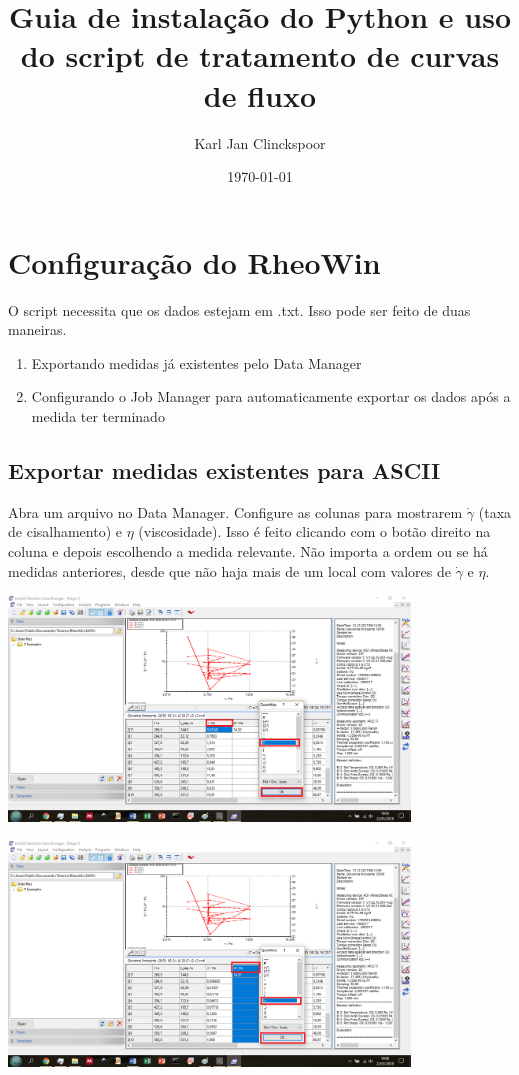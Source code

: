 \documentclass[a4paper, 12pt]{article}
\title{Guia de instalação do Python e uso do script de tratamento de curvas de fluxo}
\author{Karl Jan Clinckspoor}
\date{\today}
\begin{document}
\maketitle

\tableofcontents

\section{Configuração do RheoWin}

O script necessita que os dados estejam em .txt. Isso pode ser feito de duas maneiras.

\begin{enumerate}
\item Exportando medidas já existentes pelo Data Manager
\item Configurando o Job Manager para automaticamente exportar os dados após a medida ter terminado
\end{enumerate}

\subsection{Exportar medidas existentes para ASCII}
Abra um arquivo no Data Manager. Configure as colunas para mostrarem $\dot{\gamma}$ (taxa de cisalhamento) e $\eta$ (viscosidade). Isso é feito clicando com o botão direito na coluna e depois escolhendo a medida relevante. Não importa a ordem ou se há medidas anteriores, desde que não haja mais de um local com valores de $\dot{\gamma}$ e $\eta$.

\begin{center}
\includegraphics[width=0.80\textwidth]{DataMan1}
\end{center}

\begin{center}
\includegraphics[width=0.8\textwidth]{DataMan2}
\end{center}
\end{document}
